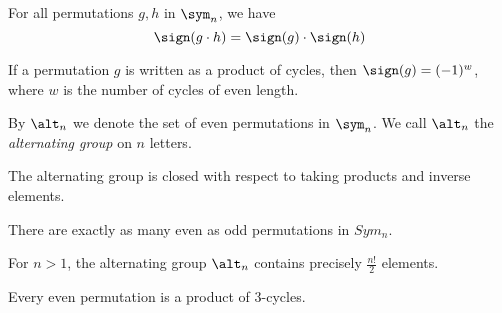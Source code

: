 \begin{theorem}
    For all permutations $ g,h $ in $ \sym_n $, we have
    $$ \sign(g \cdot h) = \sign(g) \cdot \sign(h) $$
\end{theorem}

\begin{corollary}
    If a permutation $g$ is written as a product of cycles, then $ \sign(g) = (-1)^w $,
    where $w$ is the number of cycles of even length.
\end{corollary}

\begin{definition}
    By $ \alt_n $ we denote the set of even permutations in $ \sym_n $. We call
    $ \alt_n $ the \emph{alternating group} on $n$ letters.

    The alternating group is closed with respect to taking products and inverse
    elements.
\end{definition}

There are exactly as many even as odd permutations in $ Sym_n $.

\begin{theorem}
    For $ n > 1 $, the alternating group $ \alt_n $ contains precisely
    $ \frac{n!}{2} $ elements.
\end{theorem}

\begin{theorem}
    Every even permutation is a product of 3-cycles.
\end{theorem}